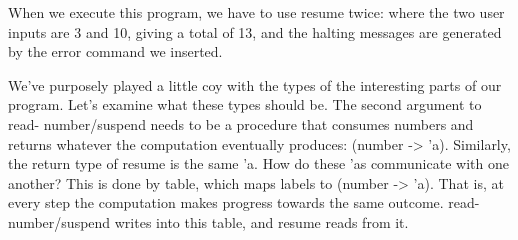 When we execute this program, we have to use resume twice:
where the two user inputs are 3 and 10, giving a total of 13, and the halting
messages are generated by the error command we inserted.

We’ve purposely played a little coy with the types of the interesting parts of
our program. Let’s examine what these types should be. The second argument to
read- number/suspend needs to be a procedure that consumes numbers and returns
whatever the computation eventually produces: (number -> 'a). Similarly, the
return type of resume is the same 'a. How do these 'as communicate with one
another? This is done by table, which maps labels to (number -> 'a). That is, at
every step the computation makes progress towards the same outcome.
read-number/suspend writes into this table, and resume reads from it.
